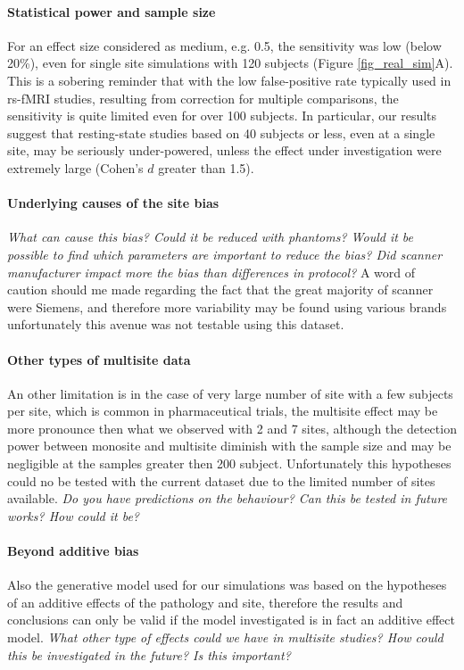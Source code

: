 \documentclass[authoryear]{elsarticle}
\begin{document}
\paragraph{Statistical power and sample size} For an effect size considered as medium, e.g. 0.5, the sensitivity was low (below 20\%), even for single site simulations with 120 subjects (Figure \ref{fig_real_sim}A). This is a sobering reminder that with the low false-positive rate typically used in rs-fMRI studies, resulting from correction for multiple comparisons, the sensitivity is quite limited even for over 100 subjects. In particular, our results suggest that resting-state studies based on 40 subjects or less, even at a single site, may be seriously under-powered, unless the effect under investigation were extremely large (Cohen's $d$ greater than 1.5). 

\paragraph{Underlying causes of the site bias} \emph{What can cause this bias? Could it be reduced with phantoms? Would it be possible to find which parameters are important to reduce the bias? Did scanner manufacturer impact more the bias than differences in protocol?} A word of caution should me made regarding the fact that the great majority of scanner were Siemens, and therefore more variability may be found using various brands unfortunately this avenue was not testable using this dataset. 

\paragraph{Other types of multisite data} An other limitation is in the case of very large number of site with a few subjects per site, which is common in pharmaceutical trials, the multisite effect may be more pronounce then what we observed with 2 and 7 sites, although the detection power between monosite and multisite diminish with the sample size and may be negligible at the samples greater then 200 subject. Unfortunately this hypotheses could no be tested with the current dataset due to the limited number of sites available. \emph{Do you have predictions on the behaviour? Can this be tested in future works? How could it be?}

\paragraph{Beyond additive bias} Also the generative model used for our simulations was based on the hypotheses of an additive effects of the pathology and site, therefore the results and conclusions can only be valid if the model investigated is in fact an additive effect model. \emph{What other type of effects could we have in multisite studies? How could this be investigated in the future? Is this important?}
\end{document}
